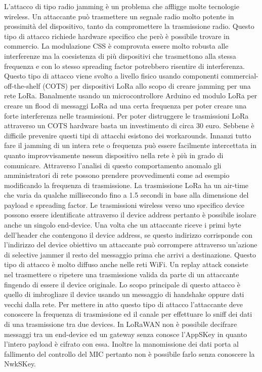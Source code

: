 \documentclass[12pt,a4paper,openright,twoside]{report}
\begin{document}
L'attacco di tipo radio jamming \`e un problema che affligge molte tecnologie wireless. Un attaccante pu\`o trasmettere un segnale radio molto potente in prossimit\`a del dispositivo, tanto da compromettere la trasmissione radio. Questo tipo di attacco richiede hardware specifico che per\`o \`e possibile trovare in commercio. La modulazione CSS \`e comprovata essere molto robusta alle interferenze ma la coesistenza di pi\`u dispositivi che trasmettono alla stessa frequenza e con lo stesso spreading factor  potrebbero risentire di interferenza. Questo tipo di attacco viene svolto a livello fisico usando componenti commercial-off-the-shelf (COTS) per dispositivi LoRa allo scopo di creare jamming per una rete LoRa. Banalmente usando un microcontrollore Arduino ed modulo LoRa per creare un flood di messaggi LoRa ad una certa frequenza per poter creare una forte interferenza nelle trasmissioni.
Per poter distruggere le trasmissioni LoRa attraverso un COTS hardware basta un investimento di circa 30 euro. Sebbene \`e difficile prevenire questi tipi di attacchi esistono dei workarounds. Innanzi tutto fare il jamming di un intera rete o frequenza pu\`o essere facilmente intercettata in quanto improvvisamente nessun dispositivo nella rete \`e pi\`u in grado di comunicare. Attraverso l'analisi di questo comportamento anomalo gli amministratori di rete possono prendere provvedimenti come ad esempio modificando la frequenza di trasmissione.
La trasmissione LoRa ha un air-time che varia da qualche millisecondo fino a 1.5 secondi in base alla dimensione del payload e spreading factor. Le trasmissioni wireless verso uno specifico device possono essere identificate attraverso il device address pertanto \`e possibile isolare anche un singolo end-device. Una volta che un attaccante riceve i primi byte dell'header che contengono il device address, se questo indirizzo corrisponde con l'indirizzo del device obiettivo un attaccante pu\`o corrompere attraverso un'azione di selective jammer il resto del messaggio prima che arrivi a destinazione. Questo tipo di attacco \`e molto diffuso anche nelle reti WiFi.
Un replay attack consiste nel trasmettere o ripetere una trasmissione valida da parte di un attaccante fingendo di essere il device originale. Lo scopo principale di questo attacco \`e quello di imbrogliare il device usando un messaggio di handshake oppure dati vecchi dalla rete. Per mettere in atto questo tipo di attacco l'attaccante deve conoscere la frequenza di trasmissione ed il canale per effettuare lo sniff dei dati di una trasmissione tra due devices.
In LoRaWAN non \`e possibile decifrare messaggi tra un end-device ed un gateway senza conosce l'AppSKey in quanto l'intero payload \`e cifrato con essa. Inoltre la manomissione dei dati porta al fallimento del controllo del MIC pertanto non \`e possibile farlo senza conoscere la NwkSKey. 
\end{document}
